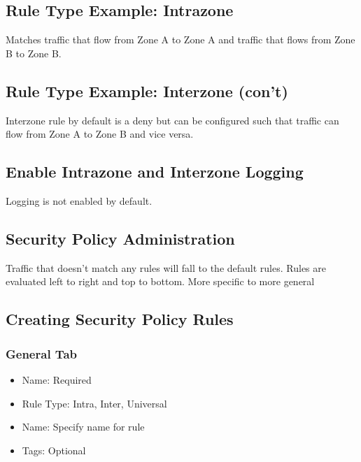 \subsection{Rule Type Example:  Intrazone}
Matches traffic that flow from Zone A to Zone A and traffic that flows from Zone B to Zone B.

\subsection{Rule Type Example:  Interzone (con't)}
Interzone rule by default is a deny but can be configured such that traffic can flow from Zone A to Zone B and vice versa.

\subsection{Enable Intrazone and Interzone Logging}
Logging is not enabled by default. 

\subsection{Security Policy Administration}
Traffic that doesn't match any rules will fall to the default rules.
Rules are evaluated left to right and top to bottom.
More specific to more general

\subsection{Creating Security Policy Rules}
\subsubsection{General Tab}
    \begin{itemize}
        \item Name: Required
        \item Rule Type: Intra, Inter, Universal
        \item Name: Specify name for rule
        \item Tags: Optional
    \end{itemize}
    
